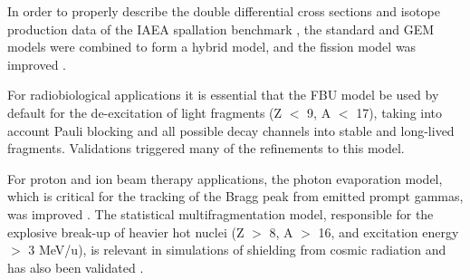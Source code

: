 In order to properly describe the double differential cross sections and isotope
production data of the IAEA spallation benchmark 
\cite{hadbib-iaea-spa-benchmark,hadbib:iaea-spa-2009}, the standard and GEM 
models were combined to form a hybrid model, and the fission model was improved
\cite{hadbib:pnst-preco-2011,hadbib:ijrb-space-2012,hadbib:iaea-spa-2009}.

For radiobiological applications it is essential that the FBU model be used by 
default for the de-excitation of light fragments (Z $<$ 9, A $<$ 17), taking 
into account Pauli blocking and all possible decay channels into stable and 
long-lived fragments.  Validations
\cite{hadbib:nima-pshenich-2010,hadbib:pmb-fluka-g4-2011}
triggered many of the refinements to this model.

For proton and ion beam therapy applications, the photon evaporation model, 
which is critical for the tracking of the Bragg peak from emitted prompt gammas, 
was improved \cite{hadbib:prompt-gamma-2014}.  The statistical 
multifragmentation model, responsible for the explosive break-up of heavier hot
nuclei  (Z $>$ 8, A $>$ 16, and excitation energy $>$ 3 MeV/u), is relevant 
in simulations of shielding from cosmic radiation and has also been validated
\cite{hadbib:ijrb-space-2012,hadbib:nima-pshenich-2010}. 

